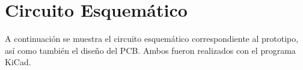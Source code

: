 \section{Circuito Esquemático}
A continuación se muestra el circuito esquemático correspondiente al prototipo, así como también el diseño del PCB. Ambos fueron realizados con el programa KiCad.\\

